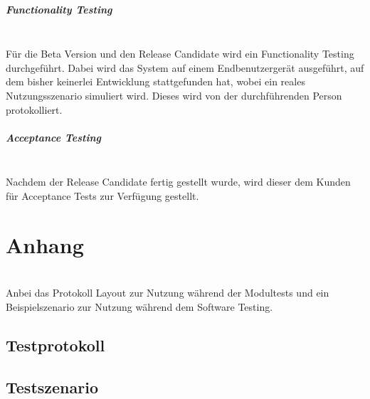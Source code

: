 \documentclass[10pt,a4paper]{article}
\begin{document}
\subparagraph{Functionality Testing}\ \\
Für die Beta Version und den Release Candidate wird ein Functionality Testing durchgeführt. Dabei wird das System auf einem Endbenutzergerät ausgeführt, auf dem bisher keinerlei Entwicklung stattgefunden hat, wobei ein reales Nutzungsszenario simuliert wird. Dieses wird von der durchführenden Person protokolliert.

\subparagraph{Acceptance Testing}\ \\
Nachdem der Release Candidate fertig gestellt wurde, wird dieser dem Kunden für Acceptance Tests zur Verfügung gestellt. 

\section{Anhang} \ \\

Anbei das Protokoll Layout zur Nutzung während der Modultests und ein Beispielszenario zur Nutzung während dem Software Testing.\\
\newpage
\subsection{Testprotokoll}

\newpage
\subsection{Testszenario}

\end{document}
